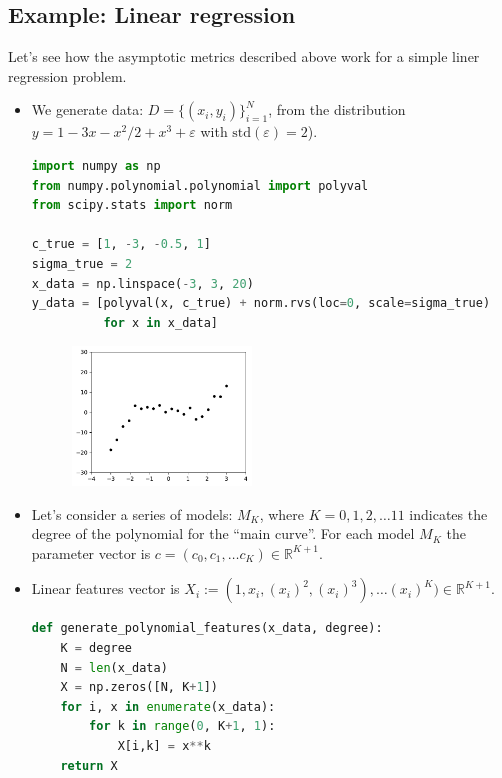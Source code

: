\subsection{Example: Linear regression}
\no Let's see how the asymptotic metrics described above work for a simple liner regression problem.
\begin{itemize}
	
	\item We generate data: $D = \{(x_i, y_i)\}_{i=1}^N$, from the distribution $y = 1 - 3x - x^2/2 + x^3 + \varepsilon$ with $\text{std}(\varepsilon) = 2$).
\begin{lstlisting}[language=python]
import numpy as np
from numpy.polynomial.polynomial import polyval
from scipy.stats import norm

c_true = [1, -3, -0.5, 1]
sigma_true = 2
x_data = np.linspace(-3, 3, 20)
y_data = [polyval(x, c_true) + norm.rvs(loc=0, scale=sigma_true) 
          for x in x_data]
\end{lstlisting}
	\begin{figure}[h]
		\centering
		\includegraphics[width=0.45\textwidth]{./figs/03-linear-regression-data.pdf}
	\end{figure}
	
	\item Let's consider a series of models: $M_K$, where $K=0,1,2,\ldots 11$ indicates the degree of the polynomial for the ``main curve''. For each model $M_K$ the parameter vector is $c = (c_0, c_1, \ldots c_K) \in \mathds{R}^{K+1}$.
	
	\item Linear features vector is $X_i := (1, x_i, (x_i)^2, (x_i)^3),\ldots (x_i)^K) \in \mathds{R}^{K+1}$.
\begin{lstlisting}[language=python]
def generate_polynomial_features(x_data, degree):
    K = degree
    N = len(x_data)
    X = np.zeros([N, K+1])
    for i, x in enumerate(x_data):
        for k in range(0, K+1, 1):
            X[i,k] = x**k
    return X
\end{lstlisting}


\end{itemize}
